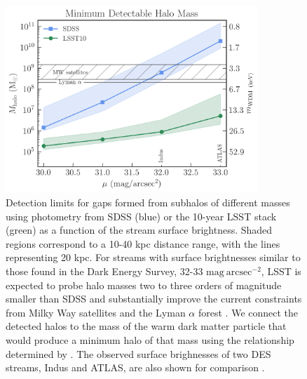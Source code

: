 \documentclass[modern,linenumbers]{aastex62}
\begin{document}
\begin{figure}
\centering
\includegraphics[width=0.85\textwidth]{figures/streamgap_constraint_2.png}
\caption{Detection limits for gaps formed from subhalos of different masses using photometry from SDSS (blue) or the 10-year LSST stack (green) as a function of the stream surface brightness. Shaded regions correspond to a 10-40 kpc distance range, with the lines representing 20 kpc. For streams with surface brightnesses similar to those found in the Dark Energy Survey, 32-33 $\mathrm{mag}\ \mathrm{arcsec}^{-2}$, LSST is expected to probe halo masses two to three orders of magnitude smaller than SDSS and substantially improve the current constraints from Milky Way satellites \citep{Nadler:2018, Jethwa:2018,Kim:2017iwr} and the Lyman $\alpha$ forest \citep{2017PhRvD..96b3522I}. We connect the detected halos to the mass of the warm dark matter particle that would produce a minimum halo of that mass using the relationship determined by \cite{Bullock:2017xww}. The observed surface brighnesses of two DES streams, Indus and ATLAS, are also shown for comparison \citep{2018ApJ...862..114S}. \label{fig:streamsurveys}}
\end{figure}
\end{document}
